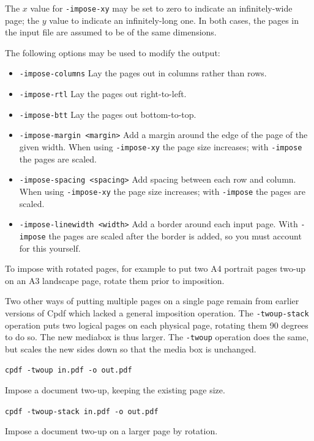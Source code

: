 \documentclass{book}
\begin{document}
\noindent The $x$ value for \texttt{-impose-xy} may be set to zero to indicate an infinitely-wide page; the $y$ value to indicate an infinitely-long one. In both cases, the pages in the input file are assumed to be of the same dimensions.

The following options may be used to modify the output:

\begin{itemize}
\item \texttt{-impose-columns} Lay the pages out in columns rather than rows.
\item \texttt{-impose-rtl} Lay the pages out right-to-left.
\item \texttt{-impose-btt} Lay the pages out bottom-to-top.
\item \texttt{-impose-margin <margin>} Add a margin around the edge of the page of the given width. When using \texttt{-impose-xy} the page size increases; with \texttt{-impose} the pages are scaled.
\item \texttt{-impose-spacing <spacing>} Add spacing between each row and column. When using \texttt{-impose-xy} the page size increases; with \texttt{-impose} the pages are scaled.
\item \texttt{-impose-linewidth <width>} Add a border around each input page. With \texttt{-impose} the pages are scaled after the border is added, so you must account for this yourself.

\end{itemize}

\noindent To impose with rotated pages, for example to put two A4 portrait pages two-up on an A3 landscape page, rotate them prior to imposition.

Two other ways of putting multiple pages on a single page remain from earlier versions of Cpdf which lacked a general imposition operation.  The \texttt{-twoup-stack} operation puts two logical pages on each physical
page, rotating them 90 degrees to do so. The new mediabox is thus larger. The \texttt{-twoup} operation does the same, but scales the new sides down so
that the media box is unchanged.

  \begin{framed}
    \noindent\small\verb!cpdf -twoup in.pdf -o out.pdf!
 
    \vspace{2.5mm}
    \noindent Impose a document two-up, keeping the existing page size.

    \vspace{2.5mm}
    \noindent\small\verb!cpdf -twoup-stack in.pdf -o out.pdf!
 
    \vspace{2.5mm}
    \noindent Impose a document two-up on a larger page by rotation. 
  \end{framed}
 
\end{document}

